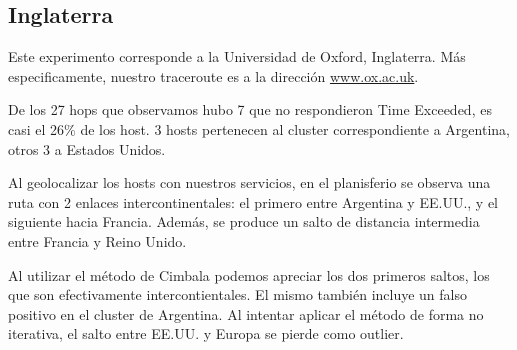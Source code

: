 \subsection{Inglaterra}

Este experimento corresponde a la Universidad de Oxford, Inglaterra. Más especificamente, nuestro traceroute es a la dirección \url{www.ox.ac.uk}.

De los 27 hops que observamos hubo 7 que no respondieron Time Exceeded, es casi el 26\% de los host. 3 hosts pertenecen al cluster correspondiente a Argentina, otros 3 a Estados Unidos. 

Al geolocalizar los hosts con nuestros servicios, en el planisferio se observa una ruta con 2 enlaces intercontinentales: el primero entre Argentina y EE.UU., y el siguiente hacia Francia. Además, se produce un salto de distancia intermedia entre Francia y Reino Unido.

Al utilizar el método de Cimbala podemos apreciar los dos primeros saltos, los que son efectivamente intercontientales. El mismo también incluye un falso positivo en el cluster de Argentina. Al intentar aplicar el método de forma no iterativa, el salto entre EE.UU. y Europa se pierde como outlier.